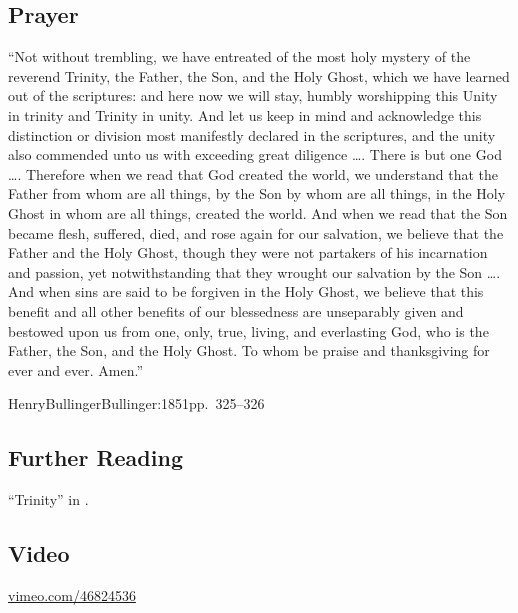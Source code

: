 \documentclass[00-main.tex]{subfiles}
\begin{document}
\subsection{Prayer}
``Not without trembling, we have entreated of the most holy mystery of the reverend Trinity, the Father, the Son, and the Holy Ghost, which we have learned out of the scriptures: and here now we will stay, humbly worshipping this Unity in trinity and Trinity in unity. And let us keep in mind and acknowledge this distinction or division most manifestly declared in the scriptures, and the unity also commended unto us with exceeding great diligence \dots. There is but one God \dots. Therefore when we read that God created the world, we understand that the Father from whom are all things, by the Son by whom are all things, in the Holy Ghost in whom are all things, created the world. And when we read that the Son became flesh, suffered, died, and rose again for our salvation, we believe that the Father and the Holy Ghost, though they were not partakers of his incarnation and passion, yet notwithstanding that they wrought our salvation by the Son \dots. And when sins are said to be forgiven in the Holy Ghost, we believe that this benefit and all other benefits of our blessedness are unseparably given and bestowed upon us from one, only, true, living, and everlasting God, who is the Father, the Son, and the Holy Ghost. To whom be praise and thanksgiving for ever and ever. Amen.''

\begin{NameCite}
{Henry}{Bullinger}{Bullinger:1851}{pp.\ 325--326}
\end{NameCite}

\begin{multicols*}{2}
	\subsection{Further Reading}
	
	``Trinity'' in \cite{Packer:2001}.
	
	\subsection{Video}
	\href{https://vimeo.com/46824536}{vimeo.com\slash{}46824536}
\end{multicols*}
\end{document}
